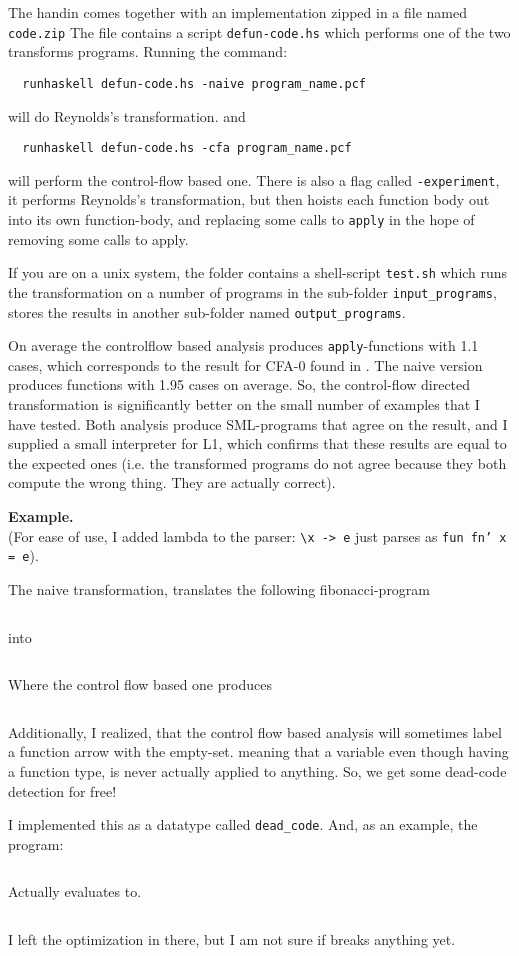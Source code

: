 The handin comes together with an implementation zipped in a file named {\tt code.zip}
The file contains a script {\tt defun-code.hs}
which performs one of the two transforms programs.
Running the command:
\begin{verbatim}
  runhaskell defun-code.hs -naive program_name.pcf
\end{verbatim}
will do Reynolds's transformation.
and
\begin{verbatim}
  runhaskell defun-code.hs -cfa program_name.pcf
\end{verbatim}
will perform the control-flow based one.
There is also a flag called {\tt -experiment},
it performs Reynolds's transformation, but then hoists each function body
out into its own function-body, and replacing some calls to {\tt apply}
in the hope of removing some calls to apply.

If you are on a unix system, the folder contains a shell-script {\tt test.sh}
which runs the transformation on a number of programs in the sub-folder
{\tt input\_programs}, stores the results in another sub-folder
named {\tt output\_programs}.

On average the controlflow based analysis produces {\tt apply}-functions
with 1.1 cases, which corresponds to the result for CFA-0 found in \cite{cfa0-mlton}.
The naive version produces functions with 1.95 cases on average.
So, the control-flow directed transformation is significantly better on the
small number of examples that I have tested. Both analysis produce SML-programs
that agree on the result, and I supplied a small interpreter for L1,
which confirms that these results are equal to the expected ones
(i.e. the transformed programs do not agree because they both
compute the wrong thing. They are actually correct).

{\bf Example.}\\
(For ease of use, I added lambda to the parser: {\tt \textbackslash{x} -> e}
just parses as {\tt fun fn' x = e}).

The naive transformation, translates the following fibonacci-program
\inputminted{text}{../code/input_programs/fib.pcf}

into

\inputminted[frame=single, breaklines]{sml}{../code/output_programs/naive_fib.sml}

Where the control flow based one produces

\inputminted[frame=single, breaklines]{sml}{../code/output_programs/cfa_fib.sml}

Additionally, I realized, that the control flow based analysis
will sometimes label a function arrow with the empty-set.
meaning that a variable even though having a function type, is
never actually applied to anything.
So, we get some dead-code detection for free!

I implemented this as a datatype called {\tt dead\_code}.
And, as an example, the program:
\inputminted{text}{../code/input_programs/dead_fun.pcf}

Actually evaluates to.
\inputminted[frame=single, breaklines]{sml}{../code/output_programs/cfa_dead_fun.sml}

I left the optimization in there, but I am not sure if breaks anything yet.
